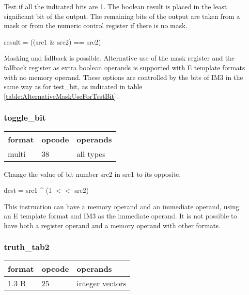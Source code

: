\documentclass[forwardcom.tex]{subfiles}
\begin{document}
Test if all the indicated bits are 1.
The boolean result is placed in the least significant bit of the output. The remaining bits of the output are taken from a mask or from the numeric control register if there is no mask.
\vspace{2mm}

result = ((src1 \& src2) == src2)

\vspace{2mm}
Masking and fallback is possible. Alternative use of the mask register and the fallback register as extra boolean operands is supported with E template formats with no memory operand. These options are controlled by the bits of IM3 in the same way as for test\_bit, as indicated in table \ref{table:AlternativeMaskUseForTestBit}.

\subsubsection{toggle\_bit}
\label{table:toggleBitInstruction}
\begin{tabular}{|p{12mm}|p{12mm}|p{110mm}|}
\hline
\bfseries format & \bfseries opcode & \bfseries operands \\ \hline
multi & 38 & all types \\ \hline
\end{tabular}
\vspace{2mm}

Change the value of bit number src2 in src1 to its opposite.
\vspace{2mm}

dest = src1 \^{} (1 $<<$ src2)

\vspace{2mm}
This instruction can have a memory operand and an immediate operand, using an E template format and IM3 as the immediate operand. It is not possible to have both a register operand and a memory operand with other formats.
\vspace{2mm}


\subsubsection{truth\_tab2}
\label{table:truthTab2Instruction}
\begin{tabular}{|p{12mm}|p{12mm}|p{110mm}|}
\hline
\bfseries format & \bfseries opcode & \bfseries operands \\ \hline
1.3 B & 25 & integer vectors \\ \hline
\end{tabular}
\vspace{2mm}
\end{document}

